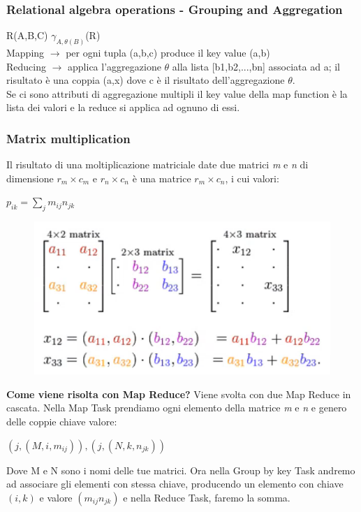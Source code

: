 \subsubsection{Relational algebra operations - Grouping and Aggregation}

R(A,B,C) $\gamma_{A, \theta(B)}$(R) 
\\
Mapping $\rightarrow$ per ogni tupla (a,b,c) produce il key value (a,b)
\\
Reducing $\rightarrow$ applica l'aggregazione $\theta$ alla lista [b1,b2,...,bn] associata ad a; il risultato è una coppia (a,x) dove c è il risultato dell'aggregazione $\theta$. 
\\
Se ci sono attributi di aggregazione multipli il key value della map function è la lista dei valori e la reduce si applica ad ognuno di essi. 
\subsubsection{Matrix multiplication}
Il risultato di una moltiplicazione matriciale date due matrici \textit{m} e \textit{n} di dimensione $r_m \times c_m$ e $r_n \times c_n$ è una matrice $r_m \times c_n$, i cui valori:
\begin{center}
    \begin{math}
        p_{ik} = \sum_j m_{ij} n_{jk}
    \end{math}
\end{center}
\begin{figure}[th]
    \centering
    \includegraphics[scale=0.6]{MapReduce/img/MatrixMolt.png}
    \label{fig:matrixmolt}
\end{figure}
\textbf{Come viene risolta con Map Reduce?} Viene svolta con due Map Reduce in cascata. Nella Map Task prendiamo ogni elemento della matrice \textit{m} e \textit{n} e genero delle coppie chiave valore:
\begin{center}
    \begin{math}
        (j, (M, i, m_{ij})), (j, (N, k, n_{jk}))
    \end{math}
\end{center}
Dove M e N sono i nomi delle tue matrici. Ora nella Group by key Task andremo ad associare gli elementi con stessa chiave, producendo un elemento con chiave $(i,k)$ e valore $(m_{ij}n_{jk})$ e nella Reduce Task, faremo la somma. 
\newpage
